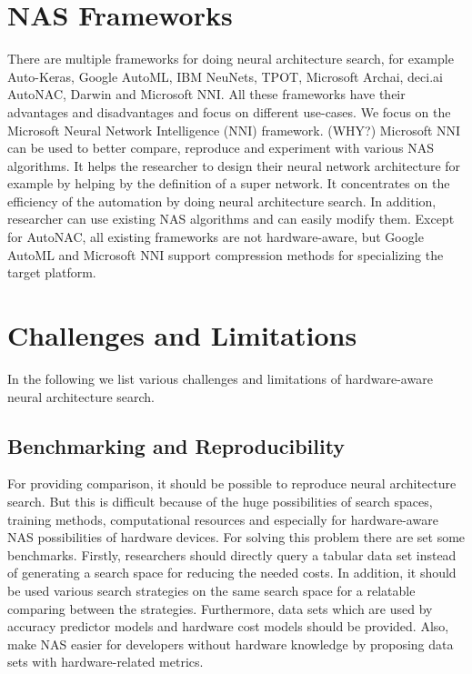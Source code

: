 \documentclass[conference]{IEEEtran}
\begin{document}
\section{NAS Frameworks}
\label{section:Frameworks}

There are multiple frameworks for doing neural architecture search, for example Auto-Keras, Google AutoML, IBM NeuNets, TPOT, Microsoft Archai, deci.ai AutoNAC, Darwin and Microsoft NNI. All these frameworks have their advantages and disadvantages and focus on different use-cases. We focus on the Microsoft Neural Network Intelligence (NNI) framework. (WHY?) Microsoft NNI can be used to better compare, reproduce and experiment with various NAS algorithms. It helps the researcher to design their neural network architecture for example by helping by the definition of a super network. It concentrates on the efficiency of the automation by doing neural architecture search. In addition, researcher can use existing NAS algorithms and can easily modify them. Except for AutoNAC, all existing frameworks are not hardware-aware, but Google AutoML and Microsoft NNI support compression methods for specializing the target platform. 

\section{Challenges and Limitations}
\label{section:Challenges}

In the following we list various challenges and limitations of hardware-aware neural architecture search. 

\subsection{Benchmarking and Reproducibility}

For providing comparison, it should be possible to reproduce neural architecture search. But this is difficult because of the huge possibilities of search spaces, training methods, computational resources and especially for hardware-aware NAS possibilities of hardware devices. For solving this problem there are set some benchmarks. Firstly, researchers should directly query a tabular data set instead of generating a search space for reducing the needed costs. In addition, it should be used various search strategies on the same search space for a relatable comparing between the strategies. Furthermore, data sets which are used by accuracy predictor models and hardware cost models should be provided. Also, make NAS easier for developers without hardware knowledge by proposing data sets with hardware-related metrics.
\end{document}
